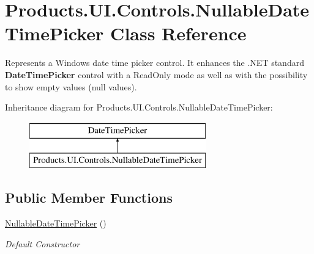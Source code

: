 \hypertarget{class_products_1_1_u_i_1_1_controls_1_1_nullable_date_time_picker}{}\section{Products.\+U\+I.\+Controls.\+Nullable\+Date\+Time\+Picker Class Reference}
\label{class_products_1_1_u_i_1_1_controls_1_1_nullable_date_time_picker}


Represents a Windows date time picker control. It enhances the .N\+ET standard {\bfseries Date\+Time\+Picker} control with a Read\+Only mode as well as with the possibility to show empty values (null values).  


Inheritance diagram for Products.\+U\+I.\+Controls.\+Nullable\+Date\+Time\+Picker\+:\begin{figure}[H]
\begin{center}
\leavevmode
\includegraphics[height=2.000000cm]{class_products_1_1_u_i_1_1_controls_1_1_nullable_date_time_picker}
\end{center}
\end{figure}
\subsection*{Public Member Functions}
\begin{DoxyCompactItemize}
\item 
\hyperlink{class_products_1_1_u_i_1_1_controls_1_1_nullable_date_time_picker_ad2767bef5d149ca9145f02c748085424}{Nullable\+Date\+Time\+Picker} ()
\begin{DoxyCompactList}\small\item\em Default Constructor \end{DoxyCompactList}\end{DoxyCompactItemize}
